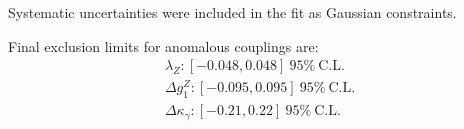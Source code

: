 


Systematic uncertainties were included in the fit as Gaussian
constraints.

Final exclusion limits for anomalous couplings are:
\begin{align}
  \lambda_{Z}: [-0.048,0.048]~95\%~\mathrm{C.L.}\\
  \Delta g^{Z}_1: [-0.095,0.095]~95\%~\mathrm{C.L.}\\
  \Delta\kappa_\gamma: [-0.21,0.22]~95\%~\mathrm{C.L.}\\
\end{align}

